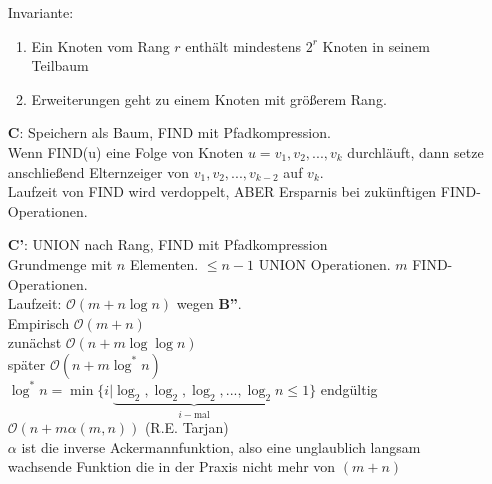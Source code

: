 \begin{enumerate}
Invariante: \begin{enumerate}
\item Ein Knoten vom Rang $r$ enthält mindestens $2^r$ Knoten in seinem Teilbaum
\item Erweiterungen geht zu einem Knoten mit größerem Rang.
\end{enumerate}
\item[\textbf{C}:] Speichern als Baum, FIND mit Pfadkompression.\\
Wenn FIND(u) eine Folge von Knoten $u = v_1,v_2,...,v_k$ durchläuft, dann setze anschließend Elternzeiger von $v_1,v_2,...,v_{k-2}$ auf $v_k$.\\
Laufzeit von FIND wird verdoppelt, ABER Ersparnis bei zukünftigen FIND-Operationen.
\item[\textbf{C'}:] UNION nach Rang, FIND mit Pfadkompression\\
Grundmenge mit $n$ Elementen. $\leq n-1$ UNION Operationen. $m$ FIND-Operationen.\\
Laufzeit: $\mathcal{O}(m+n \log n)$ wegen \textbf{B''}.\\
Empirisch $\mathcal{O}(m+n)$ \\
zunächst $\mathcal{O}(n+m \log \log n)$\\
später $\mathcal{O}(n+m \log^*n)$\\
$\log^* n = \min \{i | \underbrace{\log_2,\log_2,\log_2,...,\log_2}_{i-\text{mal}} n \leq 1 \}$
endgültig $\mathcal{O}(n+m \alpha(m,n))$ (R.E. Tarjan)\\
$\alpha$ ist die inverse Ackermannfunktion, also eine  unglaublich langsam wachsende Funktion die in der Praxis nicht mehr von $(m+n)$
\end{enumerate}
